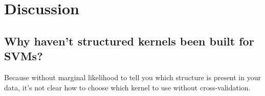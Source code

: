 \section{Discussion}

\subsection{Why haven't structured kernels been built for SVMs?}

Because without marginal likelihood to tell you which structure is present in your data, it's not clear how to choose which kernel to use without cross-validation.




\outbpdocument{


}
